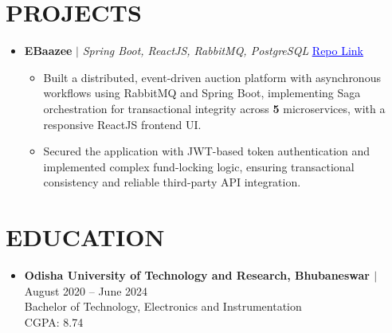 \documentclass[a4paper,11pt]{article}
\begin{document}
\section{PROJECTS}
\begin{itemize}[leftmargin=0in, label={}]
  \item
    \textbf{EBaazee} $|$ \textit{Spring Boot, ReactJS, RabbitMQ, PostgreSQL} \hfill
    \href{https://github.com/BITSSAP2025AugAPIBP3Sections/APIBP-20242YB-Team-01}{\textcolor{blue}{\underline{Repo Link}}}
    \begin{itemize}[leftmargin=0.18in, itemsep=0.5pt, topsep=1pt]
      \item \small{Built a distributed, event-driven auction platform with asynchronous workflows using RabbitMQ and Spring Boot, implementing Saga orchestration for transactional integrity across \textbf{5} microservices, with a responsive ReactJS frontend UI.}
      \item \small{Secured the application with JWT-based token authentication and implemented complex fund-locking logic, ensuring transactional consistency and reliable third-party API integration.}
    \end{itemize}
\end{itemize}


\section{EDUCATION}
\begin{itemize}[leftmargin=0in, label={}]
  \item
    \textbf{\normalsize Odisha University of Technology and Research, Bhubaneswar $|$ }August 2020 -- June 2024 \\
    \normalsize Bachelor of Technology, Electronics and Instrumentation \\
    \normalsize CGPA: 8.74
\end{itemize}

\end{document}
